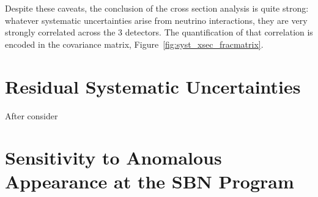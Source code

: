 Despite these caveats, the conclusion of the cross section analysis is quite strong: whatever systematic uncertainties arise from neutrino interactions, they are very strongly correlated across the 3 detectors.  The quantification of that correlation is encoded in the covariance matrix, Figure~\ref{fig:syst_xsec_fracmatrix}.

\section{Residual Systematic Uncertainties}

After consider

\section{Sensitivity to Anomalous \nue Appearance at the SBN Program}
